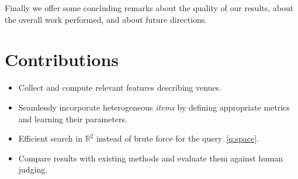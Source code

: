 Finally we offer some concluding remarks about the quality of our results,
about the overall work performed, and about future directions.

\section{Contributions}

\begin{itemize}
	\item Collect and compute relevant features describing venues.
	\item Seamlessly incorporate heterogeneous \emph{items} by defining
		appropriate metrics and learning their parameters.
	\item Efficient search in $\mathbb{R}^2$ instead of brute force for
		the query~\ref{q:space}.
	\item Compare results with existing methods and evaluate them against
		human judging.
\end{itemize}
\fi
